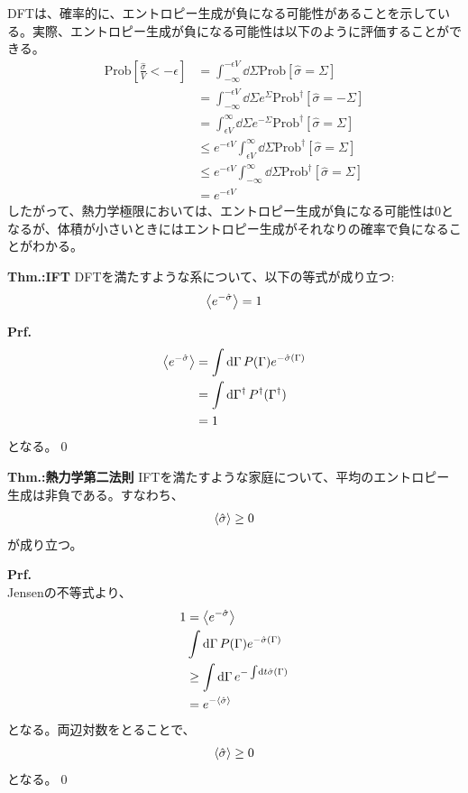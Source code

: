 \documentclass[a4paper,11pt]{jsarticle}
\numberwithin{equation}{section}
\begin{document}
DFTは、確率的に、エントロピー生成が負になる可能性があることを示している。実際、エントロピー生成が負になる可能性は以下のように評価することができる。\\
\begin{align}
  \text{Prob}\left[\frac{\hat{\sigma}}{V} < -\epsilon \right] &= \int_{-\infty}^{-\epsilon V} \dd{\Sigma}\text{Prob}[\hat{\sigma} = \Sigma]\\
  &= \int_{-\infty}^{-\epsilon V} \dd{\Sigma}e^{\Sigma}\text{Prob}^{\dagger}[\hat{\sigma} = -\Sigma]\\
  &= \int_{\epsilon V}^{\infty} \dd{\Sigma}e^{-\Sigma}\text{Prob}^{\dagger}[\hat{\sigma} = \Sigma]\\
  &\leq e^{-\epsilon V} \int_{\epsilon V}^{\infty} \dd{\Sigma}\text{Prob}^{\dagger}[\hat{\sigma} = \Sigma]\\
  &\leq e^{-\epsilon V} \int_{-\infty}^{\infty} \dd{\Sigma}\text{Prob}^{\dagger}[\hat{\sigma} = \Sigma]\\
  &= e^{-\epsilon V}
\end{align}
したがって、熱力学極限においては、エントロピー生成が負になる可能性は0となるが、体積が小さいときにはエントロピー生成がそれなりの確率で負になることがわかる。\\

\begin{itembox}[l]{\textbf{Thm.:IFT}}
  DFTを満たすような系について、以下の等式が成り立つ:
  \begin{align}
    \ev{e^{-\hat{\sigma}}} = 1
  \end{align}
\end{itembox}
\textbf{Prf.}\\
\begin{align}
  \ev{e^{-\hat{\sigma}}} &= \int \dd{\Gamma}P(\Gamma)e^{-\hat{\sigma}(\Gamma)}\\
  &= \int \dd{\Gamma^{\dagger}}P^{\dagger}(\Gamma^{\dagger})\\
  &= 1
\end{align}
となる。\qed

\begin{itembox}[l]{\textbf{Thm.:熱力学第二法則}}
  IFTを満たすような家庭について、平均のエントロピー生成は非負である。すなわち、
  \begin{align}
    \ev{\hat{\sigma}} \geq 0
  \end{align}
  が成り立つ。
\end{itembox}
\textbf{Prf.}\\
Jensenの不等式より、
\begin{align}
  1 &= \ev{e^{-\hat{\sigma}}}\\
  &\int \dd{\Gamma}P(\Gamma)e^{-\hat{\sigma}(\Gamma)}\\
  &\geq \int \dd{\Gamma} e^{-\int \dd{t}\hat{\sigma}(\Gamma)}\\
  &= e^{-\ev{\hat{\sigma}}}
\end{align}
となる。両辺対数をとることで、
\begin{align}
  \ev{\hat{\sigma}} \geq 0
\end{align}
となる。\qed
\end{document}
